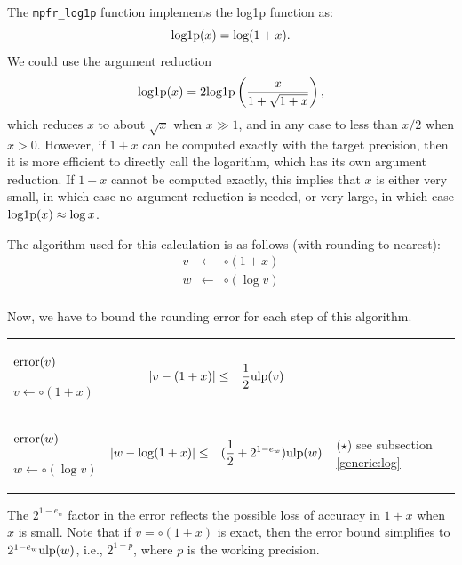 \documentclass[12pt]{amsart}
\def\ulp{{\rm ulp}}
\begin{document}
The {\tt mpfr\_log1p} function implements the log1p function as:
\[
\textnormal{log1p} (x) = \log(1+x).
\]
We could use the argument reduction
\[ \textnormal{log1p}(x) = 2 \textnormal{log1p}\left(\frac{x}{1+\sqrt{1+x}}
\right), \]
which reduces $x$ to about $\sqrt{x}$ when $x \gg 1$, and in any case to
less than $x/2$ when $x > 0$.
However, if $1+x$ can be computed exactly with the target precision,
then it is more efficient to directly call the logarithm, 
which has its own argument reduction.
If $1+x$ cannot be computed exactly, this implies that $x$ is either
very small, in which case no argument reduction is needed,
or very large, in which case $\textnormal{log1p}(x) \approx \log x$.

The algorithm used for this calculation is as follows (with rounding to
nearest):
\begin{eqnarray}\nonumber
v&\leftarrow&\circ(1+x)\\\nonumber
w&\leftarrow&\circ(\log v)\\\nonumber
\end{eqnarray}

Now, we have to bound the rounding error for each step of this
algorithm.

\begin{center}
\begin{tabular}{l l l}
\begin{minipage}{2.5cm}
${\textnormal{error}}(v)$


$v \leftarrow \circ(1+x) $

\end{minipage} &
\begin{minipage}{7.5cm}

\begin{eqnarray}\nonumber
  |v-(1+x)| &\leq& \frac{1}{2}\ulp(v)
\end{eqnarray}


\end{minipage} & \\%
\begin{minipage}{2.5cm}
${\textnormal{error}}(w)$


$w \leftarrow \circ(\log v) $

\end{minipage} &
\begin{minipage}{7.5cm}
\begin{eqnarray}\nonumber
  |w-\log(1+x)| &\leq& (\frac{1}{2}+2^{1-e_w}) \ulp(w)
\end{eqnarray}
\end{minipage} &
\begin{minipage}{6cm}
($\star$)
see subsection \ref{generic:log}
\end{minipage}
\end{tabular}
\end{center}
The $2^{1-e_w}$ factor in the error reflects the possible loss of accuracy
in $1+x$ when $x$ is small.
Note that if $v = \circ(1+x)$ is exact, then the error bound simplifies to
$2^{1-e_w} \ulp(w)$, i.e., $2^{1-p}$, where $p$ is the working precision.
\end{document}
